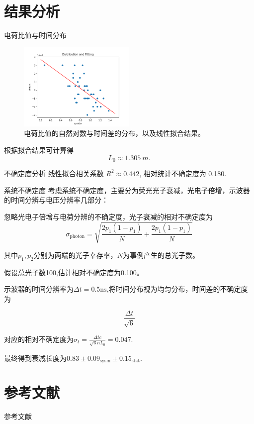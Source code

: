 \documentclass[10pt]{beamer}
\begin{document}
\section{结果分析}
\label{sec:orgc25006c}
\begin{frame}[label={sec:org93946de}]{电荷比值与时间分布}
\begin{figure}[htbp]
\centering
\includegraphics[width=0.5\textwidth]{../AttenuationLength/figs/dist.png}
\caption{电荷比值的自然对数与时间差的分布，以及线性拟合结果。}
\end{figure}

根据拟合结果可计算得
\begin{equation}
\label{eq:3}
L_0 \approx \qty{1.305}{m}.
\end{equation}
\end{frame}
\begin{frame}[label={sec:orgd4b6778}]{不确定度分析}
线性拟合相关系数 \(R^2 \approx 0.442\), 相对统计不确定度为 0.180.
\end{frame}
\begin{frame}{系统不确定度}
    考虑系统不确定度，主要分为荧光光子衰减，光电子倍增，示波器的时间分辨与电压分辨率几部分：

    忽略光电子倍增与电荷分辨的不确定度，光子衰减的相对不确定度为
    $$\sigma_\mathrm{photon}=\sqrt{\frac{2p_1(1-p_1)}{N}+\frac{2p_1(1-p_1)}{N}}$$

    其中$p_1,p_2$分别为两端的光子幸存率，$N$为事例产生的总光子数。
    
    假设总光子数100,估计相对不确定度为0.100。

    示波器的时间分辨率为$\Delta t=0.5\mathrm{ns}$,将时间分布视为均匀分布，时间差的不确定度为

    $$\frac{\Delta t}{\sqrt{6}}$$

    对应的相对不确定度为$\sigma_t=\frac{\Delta tc}{\sqrt{6}nL_0}=0.047.$

    最终得到衰减长度为$0.83\pm0.09_{\mathrm{sysm}}\pm0.15_{\mathrm{stat}}.$
\end{frame}
\section{参考文献}
\label{sec:orgf6ca842}
\begin{frame}[allowframebreaks]{参考文献}
\end{frame}
\end{document}
